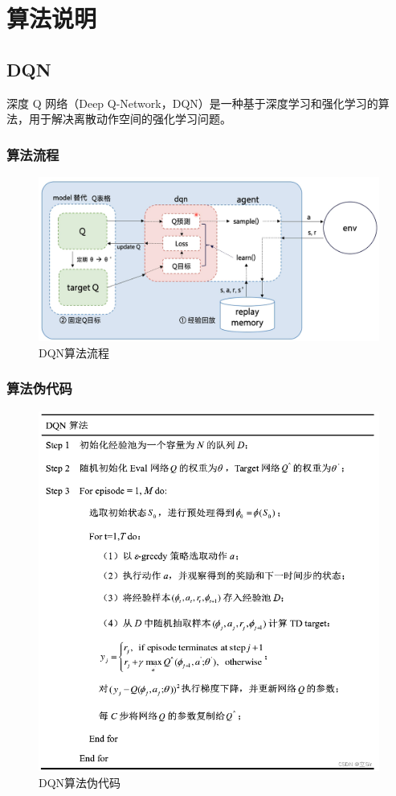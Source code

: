 \section{算法说明}

\subsection{DQN}
深度 Q 网络（Deep Q-Network，DQN）是一种基于深度学习和强化学习的算法，用于解决离散动作空间的强化学习问题。
\subsubsection{算法流程}
\begin{figure}[H]
    \centering
    \includegraphics[width=0.8\linewidth]{pic/DQN-process.png}
    \caption{ DQN算法流程}
    \label{map}
\end{figure}

\subsubsection{算法伪代码}
\begin{figure}[H]
    \centering
    \includegraphics[width=0.8\linewidth]{pic/DQN-code.png}
    \caption{ DQN算法伪代码}
    \label{map}
\end{figure}

